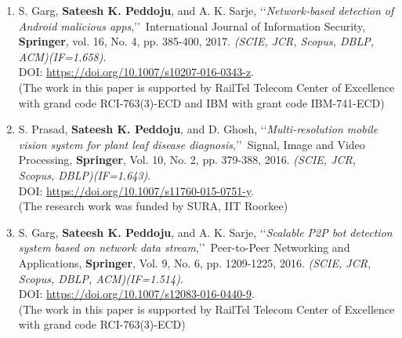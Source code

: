 \begin{enumerate}%

	\item
	S. Garg, \textbf{Sateesh K. Peddoju}, and A. K. Sarje, \lq\lq \textit{Network-based detection of Android malicious apps},\rq\rq\, International Journal of Information Security, \textbf{Springer}, vol. 16, No. 4, pp. 385-400, 2017. \emph{(SCIE, JCR, Scopus, DBLP, ACM)(IF=1.658)}. \\DOI: \url{https://doi.org/10.1007/s10207-016-0343-z}. \\(The work in this paper is supported by RailTel Telecom Center of Excellence with grand code RCI-763(3)-ECD and IBM with grant code IBM-741-ECD)
	
	\item
	S. Prasad, \textbf{Sateesh K. Peddoju}, and D. Ghosh, \lq\lq \textit{Multi-resolution mobile vision system for plant leaf disease diagnosis},\rq\rq\, Signal, Image and Video Processing, \textbf{Springer}, Vol. 10, No. 2, pp. 379-388, 2016. \emph{(SCIE, JCR,  Scopus, DBLP)(IF=1.643)}. \\DOI: \url{https://doi.org/10.1007/s11760-015-0751-y}.  \\(The research work was funded by SURA, IIT Roorkee)
	
	\item
	S. Garg, \textbf{Sateesh K. Peddoju}, and A. K. Sarje, \lq\lq \textit{Scalable P2P bot detection system based on network data stream},\rq\rq\, Peer-to-Peer Networking and Applications, \textbf{Springer}, Vol. 9, No. 6, pp. 1209-1225, 2016. \emph{(SCIE, JCR, Scopus, DBLP, ACM)(IF=1.514)}. \\DOI: \url{https://doi.org/10.1007/s12083-016-0440-9}. \\(The work in this paper is supported by RailTel Telecom Center of Excellence with grand code RCI-763(3)-ECD)
	
	
\end{enumerate}		